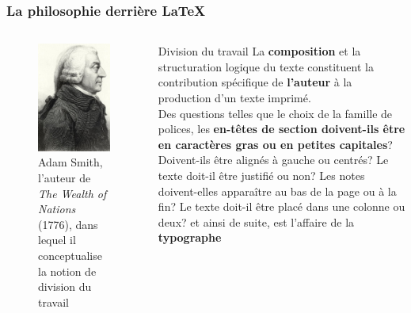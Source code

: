 \documentclass[10pt]{beamer}\usepackage[]{graphicx}\usepackage[]{color}
\begin{document}
\begin{frame}\frametitle{La philosophie derrière \LaTeX}
\begin{columns}[c] %

\begin{figure}[h!]
\centering
\includegraphics[scale=0.6, keepaspectratio]{./smith}
\small
\caption{Adam Smith, l'auteur de \textit{The Wealth of Nations} (1776), dans lequel il conceptualise la notion de division du travail}
\label{fig:smith}
\end{figure}

\small
\begin{block}{Division du travail}
La \textbf{composition} et la structuration logique du texte constituent la contribution spécifique de \textbf{l'auteur} à la production d'un texte imprimé. \\
\vspace*{0.25in}
\pause
Des questions telles que le choix de la famille de polices, les \textbf{en-têtes de section doivent-ils être en caractères gras ou en petites capitales}? Doivent-ils être alignés à gauche ou centrés? Le texte doit-il être justifié ou non? Les notes doivent-elles apparaître au bas de la page ou à la fin? Le texte doit-il être placé dans une colonne ou deux? et ainsi de suite, est l'affaire de la \textbf{typographe}
\end{block}
\end{columns}

\end{frame}
\end{document}
